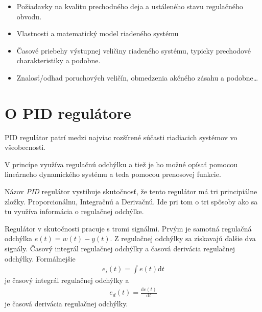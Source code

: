 \documentclass[a4paper, 10pt, ]{article}
\begin{document}
\begin{itemize}[leftmargin=0pt, labelsep=4mm, itemsep=0pt]

    \item Požiadavky na kvalitu prechodného deja a ustáleného stavu regulačného obvodu.

    \item Vlastnosti a matematický model riadeného systému

    \item Časové priebehy výstupnej veličiny riadeného systému, typicky prechodové charakteristiky a podobne.

    \item Znalosť/odhad poruchových veličín, obmedzenia akčného zásahu a podobne\ldots
\end{itemize}




























\section{O PID regulátore}

PID regulátor patrí medzi najviac rozšírené súčasti riadiacich systémov vo všeobecnosti.

V princípe využíva regulačnú odchýlku a tiež je ho možné opísať pomocou lineárneho dynamického systému a teda pomocou prenosovej funkcie.

Názov \emph{PID} regulátor vystihuje skutočnosť, že tento regulátor má tri principiálne zložky. Proporcionálnu, Integračnú a Derivačnú. Ide pri tom o tri spôsoby ako sa tu využíva informácia o regulačnej odchýlke.

Regulátor v skutočnosti pracuje s tromi signálmi. Prvým je samotná regulačná odchýlka $e(t) = w(t) - y(t)$. Z regulačnej odchýlky sa získavajú ďalšie dva signály. Časový integrál regulačnej odchýlky a časová derivácia regulačnej odchýlky. Formálnejšie
\begin{align}
    e_i(t) = \int e(t) \text{d}t
\end{align}
je časový integrál regulačnej odchýlky a
\begin{align}
    e_d(t) = \frac{\text{d}e(t)}{\text{d}t}
\end{align}
je časová derivácia regulačnej odchýlky.
\end{document}
